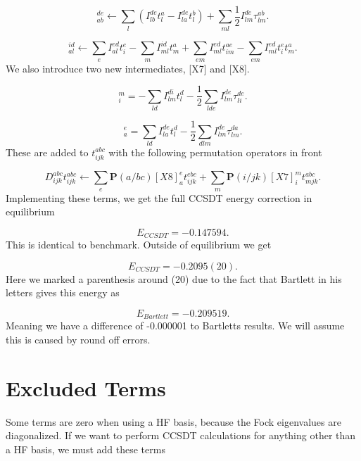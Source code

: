 \begin{equation}
[X4]_{ab}^{de} \leftarrow
\sum_l \left( 
I_{lb}^{de} t_l^a
- I_{la}^{de} t_l^b \right)
+ \sum_{ml} \frac{1}{2} I_{lm}^{de} \tau_{lm}^{ab} .
\end{equation}

\begin{equation}
[X6]_{al}^{id} \leftarrow 
\sum_{e} I_{al}^{ed} t_i^e
- \sum_m I_{ml}^{id} t_m^a
+ \sum_{em} I_{ml}^{ed} t_{im}^{ae}
- \sum_{em} I_{ml}^{ed} t_i^e t_m^a .
\end{equation}
We also introduce two new intermediates, [X7] and [X8].

\begin{equation}
[X7]_i^m = - \sum_{ld} I_{lm}^{di} t_l^d
- \frac{1}{2} \sum_{lde} I_{lm}^{de} \tau_{li}^{de} .
\end{equation}

\begin{equation}
[X8]_a^e = \sum_{ld} I_{la}^{de} t_l^d
- \frac{1}{2} \sum_{dlm} I_{lm}^{de} \tau_{lm}^{da} .
\end{equation}
These are added to $t_{ijk}^{abc}$ with the following permutation operators in front

\begin{equation}
D_{ijk}^{abc} t_{ijk}^{abc} \leftarrow \sum_e \textbf{P}(a/bc) [X8]_a^e t_{ijk}^{ebc}
+ \sum_m \textbf{P}(i/jk) [X7]_i^m  
t_{mjk}^{abc} .
\end{equation}
Implementing these terms, we get the full CCSDT energy correction in equilibrium

\begin{equation}
E_{CCSDT} = -0.147594 .
\end{equation}
This is identical to benchmark. Outside of equilibrium we get

\begin{equation}
E_{CCSDT} = -0.2095(20) .
\end{equation}
Here we marked a parenthesis around (20) due to the fact that Bartlett in his letters gives this energy as

\begin{equation}
E_{Bartlett} = -0.209519 .
\end{equation}
Meaning we have a difference of -0.000001 to Bartletts results. We will assume this is caused by round off errors.  

\section{Excluded Terms}
Some terms are zero when using a HF basis, because the Fock eigenvalues are diagonalized. If we want to perform CCSDT calculations for anything other than a HF basis, we must add these terms

